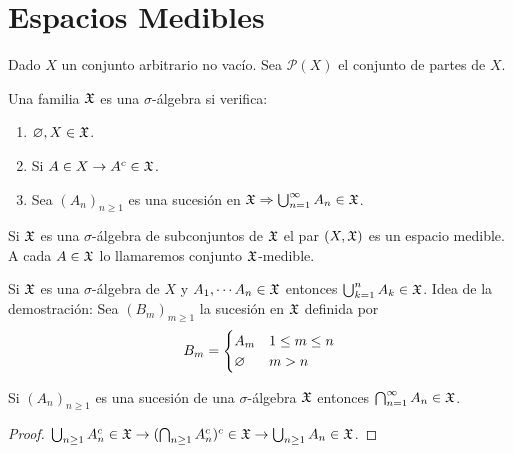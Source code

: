 \section{Espacios Medibles}

Dado $X$ un conjunto arbitrario no vacío. Sea $\mathcal{P}(X)$ el conjunto de partes de $X$.

\begin{definition}
    Una familia $\mathfrak{X}$ es una $\sigma$-álgebra si verifica:
    \begin{enumerate}
        \item $\varnothing, X \in \mathfrak{X}$.
        \item Si $A \in X \to A^c \in \mathfrak{X}$.
        \item Sea $(A_n)_{n \geq 1}$ es una sucesión en $\mathfrak{X} \Rightarrow \bigcup_{n=1}^{\infty} A_n \in \mathfrak{X}$.
    \end{enumerate}
\end{definition}

Si $\mathfrak{X}$ es una $\sigma$-álgebra de subconjuntos de $\mathfrak{X}$ el par $(X, \mathfrak{X})$ es un espacio medible. A cada $A \in \mathfrak{X}$
lo llamaremos conjunto $\mathfrak{X}$-medible.

\begin{note}
    Si $\mathfrak{X}$ es una $\sigma$-álgebra de $X$ y $A_1, \cdots A_n \in \mathfrak{X}$ entonces $\bigcup_{k=1}^{n} A_k \in \mathfrak{X}$.
    Idea de la demostración: Sea $(B_m)_{m \geq 1}$ la sucesión en $\mathfrak{X}$ definida por \begin{equation}
        B_m = \begin{cases}
            A_m & 1 \leq m \leq n \\
            \varnothing  & m > n
        \end{cases}
    \end{equation}
\end{note}

\begin{note}
    Si $(A_n)_{n \geq 1}$ es una sucesión de una $\sigma$-álgebra $\mathfrak{X}$ entonces $\bigcap_{n=1}^{\infty} A_n \in \mathfrak{X}$.
    \begin{proof}
        $\bigcup_{n \geq 1} A_n^c \in \mathfrak{X} \to (\bigcap_{n \geq 1} A_n^c)^c \in \mathfrak{X} \to \bigcup_{n \geq 1} A_n \in \mathfrak{X}$.
    \end{proof}
\end{note}

